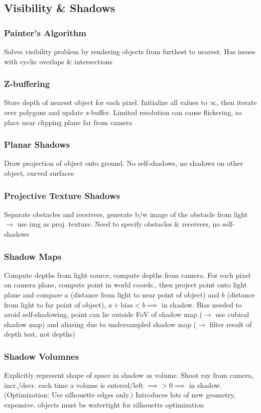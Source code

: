 \documentclass[a4paper,10pt]{article}
\begin{document}
\subsection{Visibility \& Shadows}
\subsubsection{Painter's Algorithm} Solves visibility problem by rendering objects from furthest to nearest. Has issues with cyclic overlaps \& intersections
\subsubsection{Z-buffering} Store depth of nearest object for each pixel. Initialize all values to \( \infty \), then iterate over polygons and update z-buffer.
Limited resolution can cause flickering, so place near clipping plane far from camera

\subsubsection{Planar Shadows} Draw projection of object onto ground. No self-shadows, no shadows on other object, curved surfaces
\subsubsection{Projective Texture Shadows} Separate obstacles and receivers, generate b/w image of the obstacle from light \( \to  \) use img as proj. texture. Need to specify obstacles \& receivers, no self-shadows
\subsubsection{Shadow Maps} Compute depths from light source, compute depths from camera. For each pixel on camera plane, compute point in world coords., then project point onto light plane and compare \( a \) (distance from light to near point of object) and \( b \) (distance from light to far point of object), \( a + \text{bias} < b \implies \) in shadow. Bias needed to avoid self-shadowing, point can lie outside FoV of shadow map (\( \to \) use cubical shadow map) and aliasing due to undersampled shadow map (\( \to  \) filter result of depth test, not depths)

\subsubsection{Shadow Volumnes} Explicitly represent shape of space in shadow as volume. Shoot ray from camera, incr./decr. each time a volume is entered/left \( \implies > 0 \implies \) in shadow. (Optimization: Use silhouette edges only.) Introduces lots of new geometry, expensive, objects must be watertight for silhouette optimization
\end{document}
